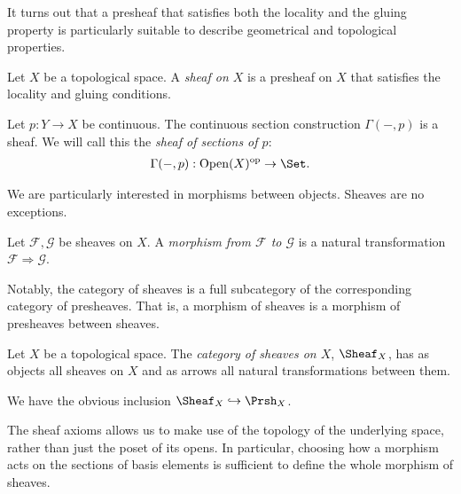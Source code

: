 \documentclass{article}
\begin{document}
It turns out that a presheaf that satisfies both the locality and the
gluing property is particularly suitable to describe geometrical
and topological properties.

\begin{definition}
  Let $X$ be a topological space. A \emph{sheaf on $X$} is a presheaf
  on $X$ that satisfies the locality and gluing conditions.
\end{definition}

\begin{example}
  Let $p:Y\to X$ be continuous. The continuous section construction
  $\Gamma(-,p)$ is a sheaf. We will call this the \emph{sheaf of
  sections of $p$}:
  \begin{align*}
    \Gamma(-,p) : \Open(X)^{\text{op}} \to \Set.
  \end{align*}
\end{example}

We are particularly interested in morphisms between objects. Sheaves
are no exceptions.
\begin{definition}
  Let $\mathscr F,\mathscr G$ be sheaves on $X$. A \emph{morphism from
  $\mathscr F$ to $\mathscr G$} is a natural transformation
  $\mathscr F\Rightarrow\mathscr G$.
\end{definition}

Notably, the category of sheaves is a full subcategory
of the corresponding category of presheaves. That is, a morphism
of sheaves is a morphism of presheaves between sheaves.

\begin{definition}
  Let $X$ be a topological space. The \emph{category of sheaves on $X$},
  $\Sheaf_X$, has as objects all sheaves on $X$ and as arrows all natural
  transformations between them.
\end{definition}

We have the obvious inclusion $\Sheaf_X\hookrightarrow \Prsh_X$.

The sheaf axioms allows us to make use of the topology of the underlying
space, rather than just the poset of its opens. In particular, choosing
how a morphism acts on the sections of basis elements is sufficient
to define the whole morphism of sheaves.
\end{document}
